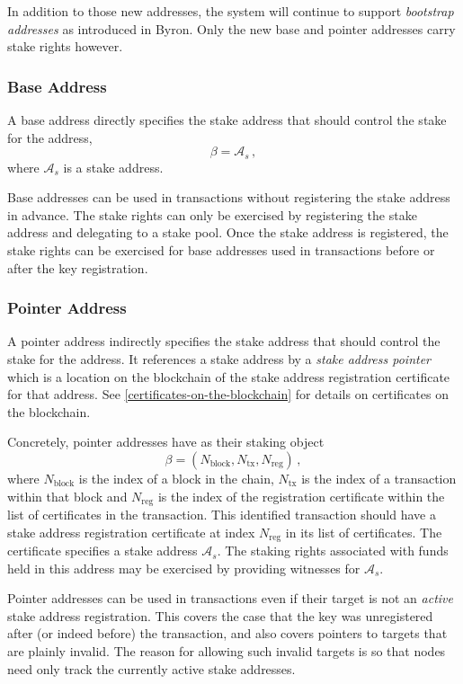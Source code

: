 \documentclass[11pt,a4paper]{article}
\begin{document}
In addition to those new addresses, the system will continue to support
\emph{bootstrap addresses} as introduced in Byron. Only the new base
and pointer addresses carry stake rights however.

\subsubsection{Base Address}
\label{base-address}

A base address directly specifies the stake address that should
control the stake for the address,
\[
\beta = \mathcal{A}_s\,,
\]
where \(\mathcal{A}_s\) is a stake address.

Base addresses can be used in transactions without registering the
stake address in advance. The stake rights can only be exercised by
registering the stake address and delegating to a stake pool. Once the
stake address is registered, the stake rights can be exercised for base
addresses used in transactions before or after the key registration.

\subsubsection{Pointer Address}
\label{pointer-address}

A pointer address indirectly specifies the stake address that should
control the stake for the address. It references a stake address by a
\emph{stake address pointer} which is a location on the blockchain of the
stake address registration certificate for that address. See
\cref{certificates-on-the-blockchain} for details on certificates on the
blockchain.

Concretely, pointer addresses have as their staking object
\[
\beta = (N_\text{block}, N_\text{tx}, N_\text{reg})\,,
\]
where \(N_\text{block}\) is the index of a block in the chain,
\(N_\text{tx}\) is the index of a transaction within that block and
\(N_\text{reg}\) is the index of the registration certificate within
the list of certificates in the transaction. This identified
transaction should have a stake address registration certificate at
index \(N_\text{reg}\) in its list of certificates. The certificate
specifies a stake address \(\mathcal{A}_s\). The staking rights associated
with funds held in this address may be exercised by providing witnesses for
\(\mathcal{A}_s\).

Pointer addresses can be used in transactions even if their target is
not an \emph{active} stake address registration. This covers the case that
the key was unregistered after (or indeed before) the transaction, and
also covers pointers to targets that are plainly invalid. The reason for
allowing such invalid targets is so that nodes need only track the
currently active stake addresses.
\end{document}
